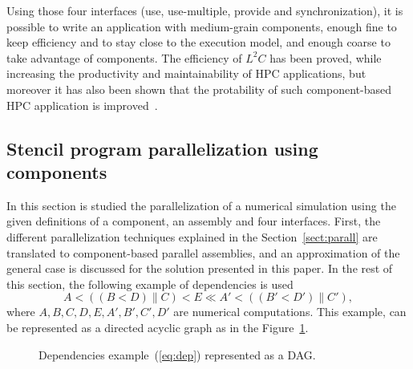 Using those four interfaces (use, use-multiple, provide and synchronization), it is possible to write an application with medium-grain components, enough fine to keep efficiency and to stay close to the execution model, and enough coarse to take advantage of components. The efficiency of $L^2C$ has been proved, while increasing the productivity and maintainability of HPC applications, but moreover it has also been shown that the protability of such component-based HPC application is improved~\cite{}.

\subsection{Stencil program parallelization using components}
In this section is studied the parallelization of a numerical simulation using the given definitions of a component, an assembly and four interfaces. First, the different parallelization techniques explained in the Section~\ref{sect:parall} are translated to component-based parallel assemblies, and an approximation of the general case is discussed for the solution presented in this paper. In the rest of this section, the following example of dependencies is used 
\begin{equation}
A<((B<D) \parallel C)<E \ll A'<((B'<D') \parallel C'),
\label{eq:dep}
\end{equation}
 where $A,B,C,D,E,A',B',C',D'$ are numerical computations. %
This example, can be represented as a directed acyclic graph as in the Figure~\ref{example}.

\begin{figure}[h!]
\begin{center}
  \caption{Dependencies example~(\ref{eq:dep}) represented as a DAG.}
  \label{example}
\end{center}
\end{figure}

